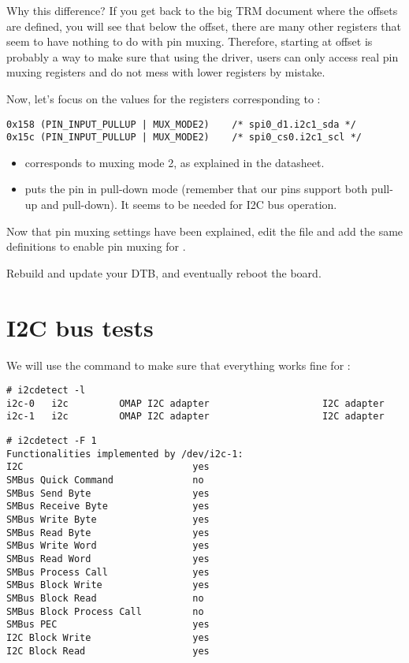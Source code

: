Why this difference? If you get back to the big TRM document where
the offsets are defined, you will see that below the 
offset, there are many other registers that seem to have nothing to do with
pin muxing. Therefore, starting at offset  is probably
a way to make sure that using the  driver, users
can only access real pin muxing registers and do not mess with lower
registers by mistake.

Now, let's focus on the values for the registers corresponding
to :

\begin{verbatim}
0x158 (PIN_INPUT_PULLUP | MUX_MODE2)    /* spi0_d1.i2c1_sda */
0x15c (PIN_INPUT_PULLUP | MUX_MODE2)    /* spi0_cs0.i2c1_scl */
\end{verbatim}

\begin{itemize}
\item {} corresponds to muxing mode 2, as explained in the
      datasheet.
\item {} puts the pin in pull-down mode (remember
      that our pins support both pull-up and pull-down). It seems to
      be needed for I2C bus operation.
\end{itemize}

Now that pin muxing settings have been explained, edit the
 file and add
the same definitions to enable pin muxing for .

Rebuild and update your DTB, and eventually reboot the board.

\section{I2C bus tests}

We will use the  command to make sure that 
everything works fine for :

\begin{verbatim}
# i2cdetect -l
i2c-0	i2c       	OMAP I2C adapter                	I2C adapter
i2c-1	i2c       	OMAP I2C adapter                	I2C adapter
\end{verbatim}

\begin{verbatim}
# i2cdetect -F 1
Functionalities implemented by /dev/i2c-1:
I2C                              yes
SMBus Quick Command              no
SMBus Send Byte                  yes
SMBus Receive Byte               yes
SMBus Write Byte                 yes
SMBus Read Byte                  yes
SMBus Write Word                 yes
SMBus Read Word                  yes
SMBus Process Call               yes
SMBus Block Write                yes
SMBus Block Read                 no
SMBus Block Process Call         no
SMBus PEC                        yes
I2C Block Write                  yes
I2C Block Read                   yes
\end{verbatim}

